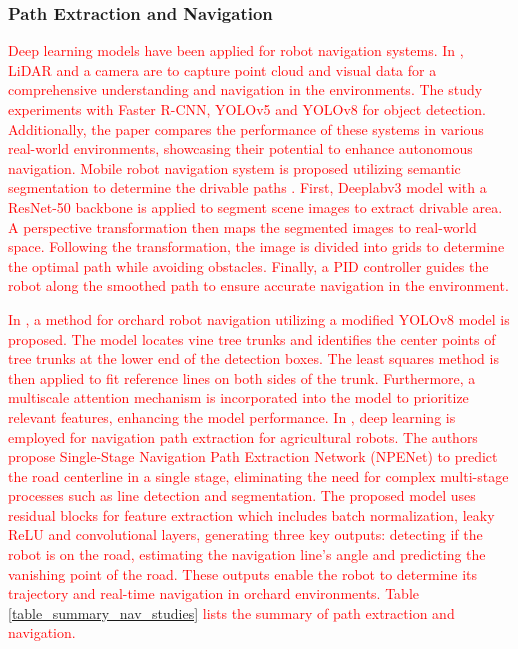 \documentclass[preprint,12pt]{elsarticle}
\begin{document}
\subsubsection{Path Extraction and Navigation}
\textcolor{red}{Deep learning models have been applied for robot navigation systems. In \citep{alotaibi_deep_2024}, LiDAR and a camera are to capture point cloud and visual data for a comprehensive understanding and navigation in the environments. The study experiments with Faster R-CNN, YOLOv5 and YOLOv8 for object detection. Additionally, the paper compares the performance of these systems in various real-world environments, showcasing their potential to enhance autonomous navigation. Mobile robot navigation system is proposed utilizing semantic segmentation to determine the drivable paths \citep{misir_drivable_2024}. First, Deeplabv3 \citep{chen_rethinking_2017} model with a ResNet-50 backbone is applied to segment scene images to extract drivable area. A perspective transformation then maps the segmented images to real-world space. Following the transformation, the image is divided into grids to determine the optimal path while avoiding obstacles. Finally, a PID controller guides the robot along the smoothed path to ensure accurate navigation in the environment.}

\textcolor{red}{In \citep{cao_orchard_2024}, a method for orchard robot navigation utilizing a modified YOLOv8 model is proposed. The model locates vine tree trunks and identifies the center points of tree trunks at the lower end of the detection boxes. The least squares method is then applied to fit reference lines on both sides of the trunk. Furthermore, a multiscale attention mechanism is incorporated into the model to prioritize relevant features, enhancing the model performance. In \citep{liu_single-stage_2025}, deep learning is employed for navigation path extraction for agricultural robots. The authors propose Single-Stage Navigation Path Extraction Network (NPENet) to predict the road centerline in a single stage, eliminating the need for complex multi-stage processes such as line detection and segmentation. The proposed model uses residual blocks for feature extraction which includes batch normalization, leaky ReLU and convolutional layers, generating three key outputs: detecting if the robot is on the road, estimating the navigation line's angle and predicting the vanishing point of the road. These outputs enable the robot to determine its trajectory and real-time navigation in orchard environments. Table \ref{table_summary_nav_studies} lists the summary of path extraction and navigation.}
\end{document}
